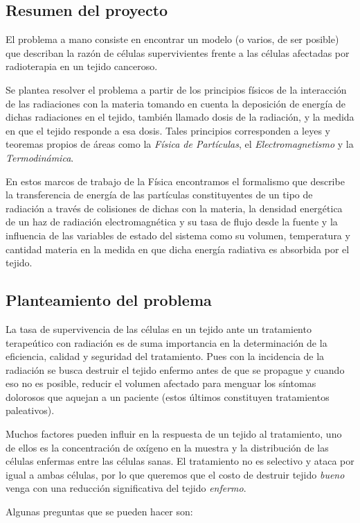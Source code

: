 \documentclass[12pt,letterpaper]{article}
\begin{document}
		\subsection*{Resumen del proyecto}
		El problema a mano consiste en encontrar un modelo (o varios, de ser posible) que describan la razón de células supervivientes frente a las células afectadas por radioterapia en un tejido canceroso. 
		
		Se plantea resolver el problema a partir de los principios físicos de la interacción de las radiaciones con la materia tomando en cuenta la deposición de energía de dichas radiaciones en el tejido, también llamado dosis de la radiación, y la medida en que el tejido responde a esa dosis. Tales principios corresponden a leyes y teoremas propios de áreas como la \textit{Física de Partículas}, el \textit{Electromagnetismo} y la \textit{Termodinámica}. 
		
		En estos marcos de trabajo de la Física encontramos el formalismo que describe la transferencia de energía de las partículas constituyentes de un tipo de radiación a través de colisiones de dichas con la materia, la densidad energética de un haz de radiación electromagnética y su tasa de flujo desde la fuente y la influencia de las variables de estado del sistema como su volumen, temperatura y cantidad materia en la medida en que dicha energía radiativa es absorbida por el tejido. 
		\subsection*{Planteamiento del problema}
		La tasa de supervivencia de las células en un tejido ante un tratamiento terapeútico con radiación es de suma importancia en la determinación de la eficiencia, calidad y seguridad del tratamiento. Pues con la incidencia de la radiación se busca destruir el tejido enfermo antes de que se propague y cuando eso no es posible, reducir el volumen afectado para menguar los síntomas dolorosos que aquejan a un paciente (estos últimos constituyen tratamientos paleativos). 
		
		Muchos factores pueden influir en la respuesta de un tejido al tratamiento, uno de ellos es la concentración de oxígeno en la muestra y la distribución de las células enfermas entre las células sanas. El tratamiento no es selectivo y ataca por igual a ambas células, por lo que queremos que el costo de destruir tejido \textit{bueno} venga con una reducción significativa del tejido \textit{enfermo}. 
		
		Algunas preguntas que se pueden hacer son:
		
\end{document}
